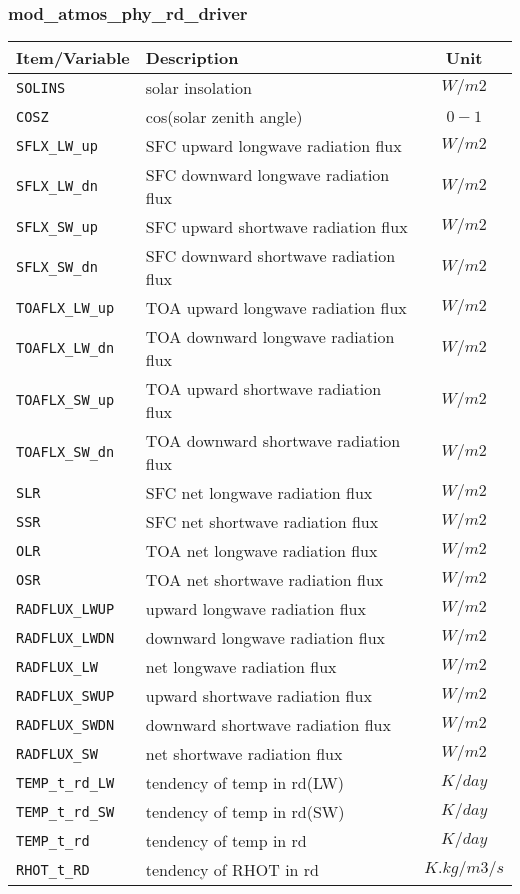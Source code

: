 \subsubsection{mod\_atmos\_phy\_rd\_driver}
 \begin{tabularx}{150mm}{|l|X|c|} \hline
 \rowcolor[gray]{0.9} Item/Variable & Description  & Unit \\ \hline
  \verb|SOLINS| & solar insolation & $W/m2$ \\\hline
  \verb|COSZ| & cos(solar zenith angle) & $0-1$ \\\hline
  \verb|SFLX_LW_up| & SFC upward longwave radiation flux    & $W/m2$ \\\hline
  \verb|SFLX_LW_dn| & SFC downward longwave radiation flux  & $W/m2$ \\\hline
  \verb|SFLX_SW_up| & SFC upward shortwave radiation flux   & $W/m2$ \\\hline
  \verb|SFLX_SW_dn| & SFC downward shortwave radiation flux & $W/m2$ \\\hline
  \verb|TOAFLX_LW_up| & TOA upward longwave radiation flux  & $W/m2$ \\\hline
  \verb|TOAFLX_LW_dn| & TOA downward longwave radiation flux &  $W/m2$ \\\hline
  \verb|TOAFLX_SW_up| & TOA upward shortwave radiation flux  & $W/m2$ \\\hline
  \verb|TOAFLX_SW_dn| & TOA downward shortwave radiation flux & $W/m2$ \\\hline
  \verb|SLR| & SFC net longwave radiation flux & $W/m2$ \\\hline
  \verb|SSR| & SFC net shortwave radiation flux & $W/m2$ \\\hline
  \verb|OLR| & TOA net longwave radiation flux & $W/m2$ \\\hline
  \verb|OSR| & TOA net shortwave radiation flux & $W/m2$ \\\hline
  \verb|RADFLUX_LWUP| & upward longwave radiation flux & $W/m2$ \\\hline
  \verb|RADFLUX_LWDN| & downward longwave radiation flux & $W/m2$ \\\hline
  \verb|RADFLUX_LW| & net longwave radiation flux & $W/m2$ \\\hline
  \verb|RADFLUX_SWUP| & upward shortwave radiation flux & $W/m2$ \\\hline
  \verb|RADFLUX_SWDN| & downward shortwave radiation flux & $W/m2$ \\\hline
  \verb|RADFLUX_SW| & net shortwave radiation flux & $W/m2$ \\\hline
  \verb|TEMP_t_rd_LW| & tendency of temp in rd(LW) & $K/day$ \\\hline
  \verb|TEMP_t_rd_SW| & tendency of temp in rd(SW) & $K/day$ \\\hline
  \verb|TEMP_t_rd| & tendency of temp in rd & $K/day$ \\\hline
  \verb|RHOT_t_RD| & tendency of RHOT in rd & $K.kg/m3/s$ \\\hline
 \end{tabularx}

